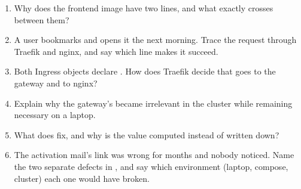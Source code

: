 \begin{quiz}
\begin{enumerate}
  \item Why does the frontend image have two  lines, and
  what exactly crosses between them?
  \item A user bookmarks  and opens it
  the next morning. Trace the request through Traefik and nginx, and
  say which line makes it succeed.
  \item Both Ingress objects declare . How does
  Traefik decide that  goes to the gateway and
   to nginx?
  \item Explain why the gateway's  became irrelevant
  in the cluster while remaining necessary on a laptop.
  \item What does  fix, and why is the value computed instead
  of written down?
  \item The activation mail's link was wrong for months and nobody
  noticed. Name the two separate defects in
  , and say
  which environment (laptop, compose, cluster) each one would have
  broken.
\end{enumerate}
\end{quiz}
